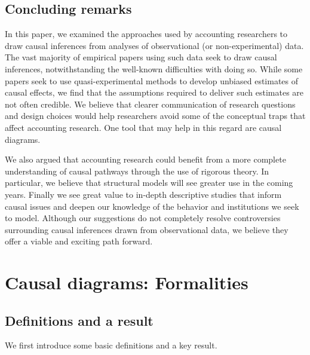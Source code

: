 \documentclass[11pt,reqno,titlepage]{amsart}
\begin{document}
\begin{doublespace}

\section{Concluding remarks} \label{sec:conclude}
In this paper, we examined the approaches used by accounting researchers to draw causal inferences from analyses of observational (or non-experimental) data. 
The vast majority of empirical papers using such data seek to draw causal inferences, notwithstanding the well-known difficulties with doing so.
While some papers seek to use quasi-experimental methods to develop unbiased estimates of causal effects, we find that the assumptions required to deliver such estimates
are not often credible. We believe that clearer communication of research questions and design choices would help researchers avoid some of the conceptual traps that affect 
accounting research. One tool that may help in this regard are causal diagrams.

We also argued that  accounting research could benefit from a more complete understanding of causal pathways through the use of rigorous theory. 
In particular, we believe that structural models will see greater use in the coming years. Finally we see great value to in-depth descriptive studies that inform 
causal issues and deepen our knowledge of the behavior and institutions we seek to model. Although our suggestions do not completely resolve controversies 
surrounding causal inferences drawn from observational data, we believe they offer a viable and exciting path forward.

\end{doublespace}

\clearpage


\clearpage



\clearpage


\appendix
\section{Causal diagrams: Formalities} \label{append}
 
 \subsection{Definitions and a result}
 We first introduce some basic definitions and a key result.
 
\end{document}
